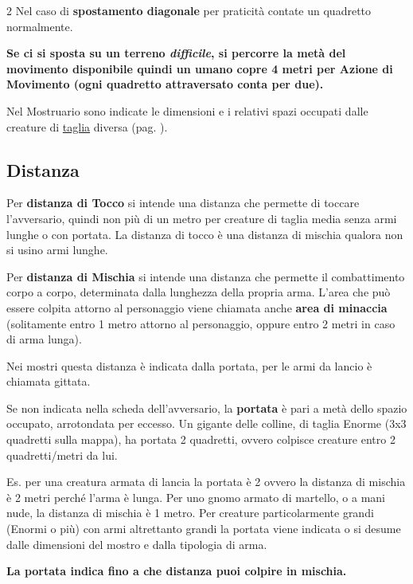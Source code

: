 \begin{multicols}{2}
Nel caso di \textbf{spostamento diagonale} per praticità contate un quadretto normalmente.

\textbf{Se ci si sposta su un terreno \emph{difficile}, si percorre la metà del movimento disponibile quindi un umano copre 4 metri per Azione di Movimento (ogni quadretto attraversato conta per due).}

Nel Mostruario sono indicate le dimensioni e i relativi spazi occupati dalle creature di \hyperlink{tagliaedimensioni}{taglia} diversa (pag. \pageref{tagliaedimensioni}).

\subsection{Distanza}\label{distanza}

Per \textbf{distanza di Tocco}   si intende una distanza che permette di toccare l'avversario, quindi non più di un metro per creature di taglia media senza armi lunghe o con portata. La distanza di tocco è una distanza di mischia qualora non si usino armi lunghe.

Per \textbf{distanza di Mischia}   si intende una distanza che permette il combattimento corpo a corpo, determinata dalla lunghezza della propria arma. L'area che può essere colpita attorno al personaggio viene chiamata anche \textbf{area di minaccia} (solitamente entro 1 metro attorno al personaggio, oppure entro 2 metri in caso di arma lunga).

Nei mostri questa distanza è indicata dalla portata, per le armi da lancio è chiamata gittata.

Se non indicata nella scheda dell'avversario, la \textbf{portata} è pari a metà dello spazio occupato, arrotondata per eccesso. Un gigante delle colline, di taglia Enorme (3x3 quadretti sulla mappa), ha portata 2 quadretti, ovvero colpisce creature entro 2 quadretti/metri da lui.

\begin{narratore}
Es. per una creatura armata di lancia la portata è 2 ovvero la distanza di mischia è 2 metri perché l'arma è lunga. Per uno gnomo armato di martello, o a mani nude, la distanza di mischia è 1 metro. Per creature particolarmente grandi (Enormi o più) con armi altrettanto grandi la portata viene indicata o si desume dalle dimensioni del mostro e dalla tipologia di arma.

\textbf{La portata indica fino a che distanza puoi colpire in mischia.}
\end{narratore}

\end{multicols}

